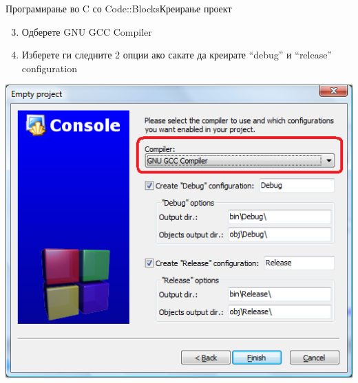 \begin{frame}{Програмирање во C со Code::Blocks}{Креирање проект}
\begin{enumerate}
\setcounter{enumi}{2}
  \item Одберете  GNU GCC Compiler
  \item Изберете ги следните 2 опции ако сакате да креирате “debug” и “release”
  configuration
\end{enumerate}
\begin{center}
\includegraphics[scale=0.3]{images/cb_compiler}
\end{center}
\end{frame}

